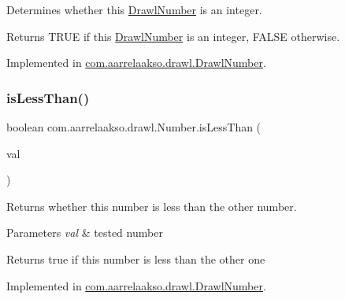 Determines whether this \hyperlink{classcom_1_1aarrelaakso_1_1drawl_1_1_drawl_number}{Drawl\+Number} is an integer. 

\begin{DoxyReturn}{Returns}
{\ttfamily T\+R\+UE} if this \hyperlink{classcom_1_1aarrelaakso_1_1drawl_1_1_drawl_number}{Drawl\+Number} is an integer, {\ttfamily F\+A\+L\+SE} otherwise. 
\end{DoxyReturn}


Implemented in \hyperlink{classcom_1_1aarrelaakso_1_1drawl_1_1_drawl_number_a520419e41b314adf719cfcd5939dee01}{com.\+aarrelaakso.\+drawl.\+Drawl\+Number}.

\mbox{\label{interfacecom_1_1aarrelaakso_1_1drawl_1_1_number_acc7fec3a209cb27e09a45f17ed9fd4e1}} 
\subsubsection{\texorpdfstring{is\+Less\+Than()}{isLessThan()}\hspace{0.1cm}{\footnotesize\ttfamily [1/2]}}
{\footnotesize\ttfamily boolean com.\+aarrelaakso.\+drawl.\+Number.\+is\+Less\+Than (\begin{DoxyParamCaption}\item[{@Not\+Null final \hyperlink{interfacecom_1_1aarrelaakso_1_1drawl_1_1_number}{Number}}]{val }\end{DoxyParamCaption})}



Returns whether this number is less than the other number. 


\begin{DoxyParams}{Parameters}
{\em val} & tested number \\
\hline
\end{DoxyParams}
\begin{DoxyReturn}{Returns}
true if this number is less than the other one 
\end{DoxyReturn}


Implemented in \hyperlink{classcom_1_1aarrelaakso_1_1drawl_1_1_drawl_number_a6b5501320af37fd5aa623ed4bcbbd104}{com.\+aarrelaakso.\+drawl.\+Drawl\+Number}.

\mbox{\label{interfacecom_1_1aarrelaakso_1_1drawl_1_1_number_a82b299428c48204fb05229dbea2b439b}} 
